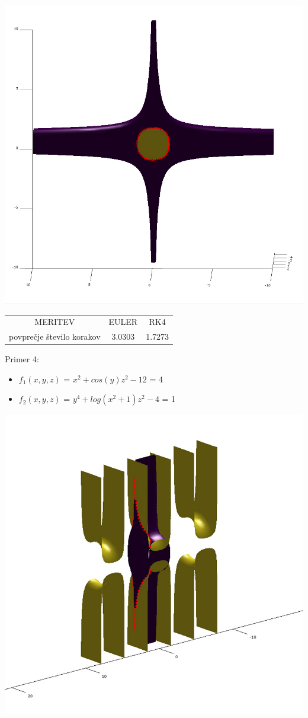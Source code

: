 \documentclass[]{article}
\begin{document}
	\includegraphics[scale=0.3]{primer3_2}
	\begin{center}
	\begin{tabular}{ |c|c|c| } 
 		\hline
 			MERITEV & EULER & RK4 \\ 
			povpre\v{c}je \v{s}tevilo korakov & 3.0303 & 1.7273 \\ 
 		\hline
 	\end{tabular}
	\end{center}
	Primer 4:
	\begin{itemize}  
		\item $f_{1}(x,y,z)$ = $x^2 + cos(y)z^2 - 12$ = 4
		\item $f_{2}(x,y,z)$ = $y^4 + log(x^2 + 1)z^2 - 4$ = 1
	\end{itemize}
	\includegraphics[scale=0.3]{primer4_1}
\end{document}
